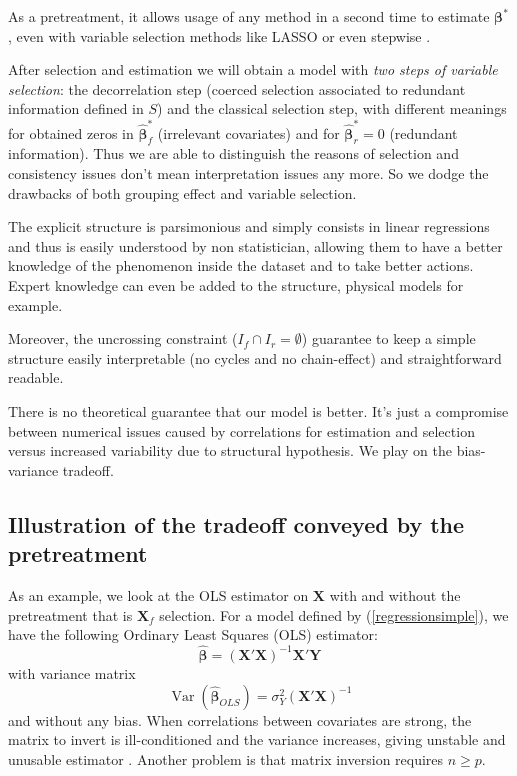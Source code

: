 \documentclass[11pt,a4paper]{article}
\begin{document}
As a pretreatment, it allows usage of any method in a second time to estimate $\boldsymbol{\beta}^*$, even with variable selection methods like LASSO or even stepwise \cite{seber2012linear}.

After selection and estimation we will obtain a model with { \it two steps of variable selection}: the decorrelation step (coerced selection associated to redundant information defined in $S$) and the classical selection step, with different meanings for obtained zeros in $\hat{\boldsymbol{\beta}}^*_f$ (irrelevant covariates) and for $\hat{\boldsymbol{\beta}}^*_r=0$ (redundant information). 
 Thus we are able to distinguish the reasons of selection and consistency issues don't mean interpretation issues any more. So we dodge the drawbacks of both grouping effect and variable selection.


The explicit structure is parsimonious and simply consists in linear regressions and thus is easily understood by non statistician, allowing them to have a better knowledge of the phenomenon inside the dataset and to take better actions. Expert knowledge can even be added to the structure, physical models for example.

Moreover, the uncrossing constraint ($I_f\cap I_r=\emptyset$) guarantee to keep a simple structure easily interpretable (no cycles and no chain-effect) and straightforward readable.

	
			There is no theoretical guarantee that our model is better. It's just a compromise between numerical issues caused by correlations for estimation and selection versus increased variability due to structural hypothesis. We play on the bias-variance tradeoff.
			 
	\subsection{Illustration of the tradeoff conveyed by the pretreatment}	
	As an example, we look at the OLS estimator on $\boldsymbol{X}$ with and without the pretreatment that is $\boldsymbol{X}_f$ selection.
For a model defined by (\ref{regressionsimple}), we have the following Ordinary Least Squares (\textsc{OLS}) estimator:
	\begin{equation}
		\boldsymbol{\hat{\beta}}=\left(\boldsymbol{X}'\boldsymbol{X} \right) ^{-1}\boldsymbol{X}'\boldsymbol{Y}
	\end{equation}
	with variance matrix
	\begin{equation}
		\operatorname{Var}(\hat{\boldsymbol{\beta}}_{OLS})=\sigma_Y^2\left(\boldsymbol{X}'\boldsymbol{X} \right) ^{-1} \label{eqOLS}
	\end{equation}
	and without any bias.
	When correlations between covariates are strong, the matrix to invert is ill-conditioned and the variance increases, giving unstable and unusable estimator \cite{hoerl1970ridge}.
	Another problem is that matrix inversion requires $n\geq p$. 	
		  
\end{document}
